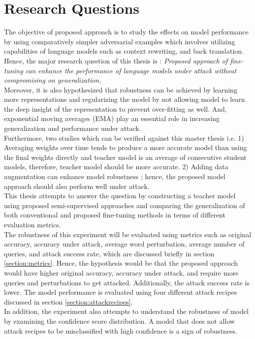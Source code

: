 \documentclass[%
	BCOR=8mm, %
	DIV=12,
	toc=bibliography, %
	toc=listof, %
	oneside, %
	egregdoesnotlikesansseriftitles, %
	]{scrbook}
\begin{document}
\section{Research Questions}
\label{section:researchquestions}
The objective of proposed approach is to study the effects on model performance by using comparatively simpler adversarial examples which involves utilizing capabilities of language models such as context rewriting, and back translation. \\
Hence, the major research question of this thesis is : \textit{Proposed approach of fine-tuning can enhance the performance of language models under attack without compromising on generalization.} \\
Moreover, it is  also hypothesized that robustness can be achieved by learning more representations and regularizing the model by not allowing model to learn the deep insight of the representation to prevent over-fitting as well. And, exponential moving averages (EMA) play an essential role in increasing generalization and performance under attack. \\
 Furthermore, two studies which can be verified against this master thesis i.e. 1) Averaging weights over time tends to produce a more accurate model than using the final weights directly \cite{polyak_acceleration_1992} and teacher model is an average of consecutive student models, therefore, teacher model should be more accurate. 2) Adding data augmentation can enhance model robustness \cite{belinkov_synthetic_2018}; hence, the proposed model approach should also perform well under attack.\\
This thesis attempts to answer the question by constructing a teacher model using proposed semi-supervised approaches and comparing the generalization of both conventional and proposed fine-tuning methods in terms of different evaluation metrics. \\
The robustness of this experiment will be evaluated using metrics such as original accuracy, accuracy under attack, average word perturbation, average number of queries, and attack success rate, which are discussed briefly in  section \ref{section:metrics}. Hence, the hypothesis would be that the proposed approach would have higher original accuracy, accuracy under attack, and require more queries and perturbations to get attacked. Additionally, the attack success rate is lower. The model performance is evaluated using four different attack recipes discussed in section \ref{section:attackrecipes}. \\
In addition, the experiment also attempts to understand the robustness of model by examining the confidence score distribution. A model that does not allow attack recipes to be misclassified with high confidence is a sign of robustness.
\end{document}
